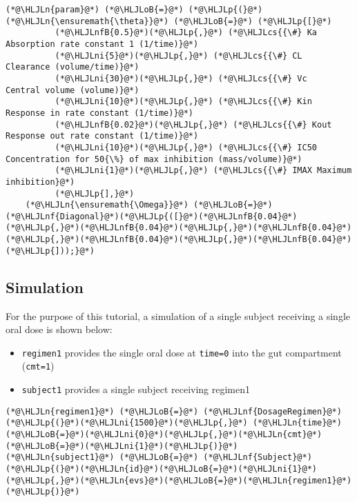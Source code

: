 \documentclass[12pt,a4paper]{article}
\newcommand{\HLJLn}[1]{#1}
\newcommand{\HLJLnf}[1]{\textcolor[RGB]{66,102,213}{#1}}
\newcommand{\HLJLnfB}[1]{\textcolor[RGB]{59,151,46}{#1}}
\newcommand{\HLJLni}[1]{\textcolor[RGB]{59,151,46}{#1}}
\newcommand{\HLJLoB}[1]{\textcolor[RGB]{102,102,102}{\textbf{#1}}}
\newcommand{\HLJLp}[1]{#1}
\newcommand{\HLJLcs}[1]{\textcolor[RGB]{153,153,119}{\textit{#1}}}
\begin{document}
\begin{lstlisting}
(*@\HLJLn{param}@*) (*@\HLJLoB{=}@*) (*@\HLJLp{(}@*)(*@\HLJLn{\ensuremath{\theta}}@*) (*@\HLJLoB{=}@*) (*@\HLJLp{[}@*)
          (*@\HLJLnfB{0.5}@*)(*@\HLJLp{,}@*) (*@\HLJLcs{{\#} Ka  Absorption rate constant 1 (1/time)}@*)
          (*@\HLJLni{5}@*)(*@\HLJLp{,}@*) (*@\HLJLcs{{\#} CL   Clearance (volume/time)}@*)
          (*@\HLJLni{30}@*)(*@\HLJLp{,}@*) (*@\HLJLcs{{\#} Vc   Central volume (volume)}@*)
          (*@\HLJLni{10}@*)(*@\HLJLp{,}@*) (*@\HLJLcs{{\#} Kin  Response in rate constant (1/time)}@*)
          (*@\HLJLnfB{0.02}@*)(*@\HLJLp{,}@*) (*@\HLJLcs{{\#} Kout Response out rate constant (1/time)}@*)
          (*@\HLJLni{10}@*)(*@\HLJLp{,}@*) (*@\HLJLcs{{\#} IC50 Concentration for 50{\%} of max inhibition (mass/volume)}@*)
          (*@\HLJLni{1}@*)(*@\HLJLp{,}@*) (*@\HLJLcs{{\#} IMAX Maximum inhibition}@*)
          (*@\HLJLp{],}@*)
    (*@\HLJLn{\ensuremath{\Omega}}@*) (*@\HLJLoB{=}@*) (*@\HLJLnf{Diagonal}@*)(*@\HLJLp{([}@*)(*@\HLJLnfB{0.04}@*)(*@\HLJLp{,}@*)(*@\HLJLnfB{0.04}@*)(*@\HLJLp{,}@*)(*@\HLJLnfB{0.04}@*)(*@\HLJLp{,}@*)(*@\HLJLnfB{0.04}@*)(*@\HLJLp{,}@*)(*@\HLJLnfB{0.04}@*)(*@\HLJLp{]));}@*)
\end{lstlisting}


\subsection{Simulation}
For the purpose of this tutorial, a simulation of a single subject receiving a single oral dose is shown below:

\begin{itemize}
\item \texttt{regimen1} provides the single oral dose at \texttt{time=0} into the gut compartment (\texttt{cmt=1})


\item \texttt{subject1} provides a single subject receiving regimen1

\end{itemize}

\begin{lstlisting}
(*@\HLJLn{regimen1}@*) (*@\HLJLoB{=}@*) (*@\HLJLnf{DosageRegimen}@*)(*@\HLJLp{(}@*)(*@\HLJLni{1500}@*)(*@\HLJLp{,}@*) (*@\HLJLn{time}@*)(*@\HLJLoB{=}@*)(*@\HLJLni{0}@*)(*@\HLJLp{,}@*)(*@\HLJLn{cmt}@*)(*@\HLJLoB{=}@*)(*@\HLJLni{1}@*)(*@\HLJLp{)}@*)
(*@\HLJLn{subject1}@*) (*@\HLJLoB{=}@*) (*@\HLJLnf{Subject}@*)(*@\HLJLp{(}@*)(*@\HLJLn{id}@*)(*@\HLJLoB{=}@*)(*@\HLJLni{1}@*)(*@\HLJLp{,}@*)(*@\HLJLn{evs}@*)(*@\HLJLoB{=}@*)(*@\HLJLn{regimen1}@*)(*@\HLJLp{)}@*)
\end{lstlisting}
\end{document}
